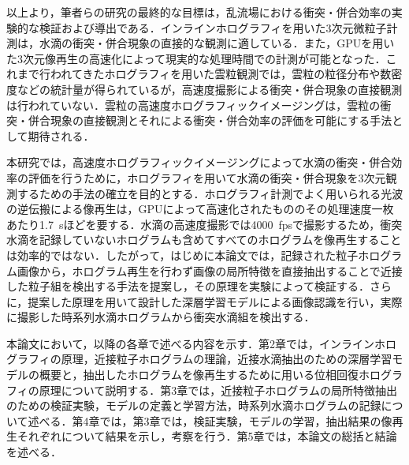 以上より，筆者らの研究の最終的な目標は，乱流場における衝突・併合効率の実験的な検証および導出である．インラインホログラフィ\cite{gabor}を用いた3次元微粒子計測\cite{tanaka2016,kubonishi2018,nakatani2019}は，水滴の衝突・併合現象の直接的な観測に適している．また，GPUを用いた3次元像再生の高速化\cite{shimobaba2008, tanaka2019, nakai2022, tanaka2024}によって現実的な処理時間での計測が可能となった．これまで行われてきたホログラフィを用いた雲粒観測\cite{thompson1974,brown1989,fugal2009}では，雲粒の粒径分布や数密度などの統計量が得られているが，高速度撮影による衝突・併合現象の直接観測は行われていない．雲粒の高速度ホログラフィックイメージングは，雲粒の衝突・併合現象の直接観測とそれによる衝突・併合効率の評価を可能にする手法として期待される．

本研究では，高速度ホログラフィックイメージングによって水滴の衝突・併合効率の評価を行うために，ホログラフィを用いて水滴の衝突・併合現象を3次元観測するための手法の確立を目的とする．ホログラフィ計測でよく用いられる光波の逆伝搬による像再生は，GPUによって高速化されたもののその処理速度一枚あたり\SI{1.7}{s}ほどを要する\cite{nakai2022}．水滴の高速度撮影では\SI{4000}{fps}で撮影するため，衝突水滴を記録していないホログラムも含めてすべてのホログラムを像再生することは効率的ではない．したがって，はじめに本論文では，記録された粒子ホログラム画像から，ホログラム再生を行わず画像の局所特徴を直接抽出することで近接した粒子組を検出する手法を提案し，その原理を実験によって検証する\cite{nakai2023}．さらに，提案した原理を用いて設計した深層学習モデルによる画像認識を行い，実際に撮影した時系列水滴ホログラムから衝突水滴組を検出する．


本論文において，以降の各章で述べる内容を示す．第2章では，インラインホログラフィの原理，近接粒子ホログラムの理論，近接水滴抽出のための深層学習モデルの概要と，抽出したホログラムを像再生するために用いる位相回復ホログラフィの原理について説明する．第3章では，近接粒子ホログラムの局所特徴抽出のための検証実験，モデルの定義と学習方法，時系列水滴ホログラムの記録について述べる．第4章では，第3章では，検証実験，モデルの学習，抽出結果の像再生それぞれについて結果を示し，考察を行う．第5章では，本論文の総括と結論を述べる．